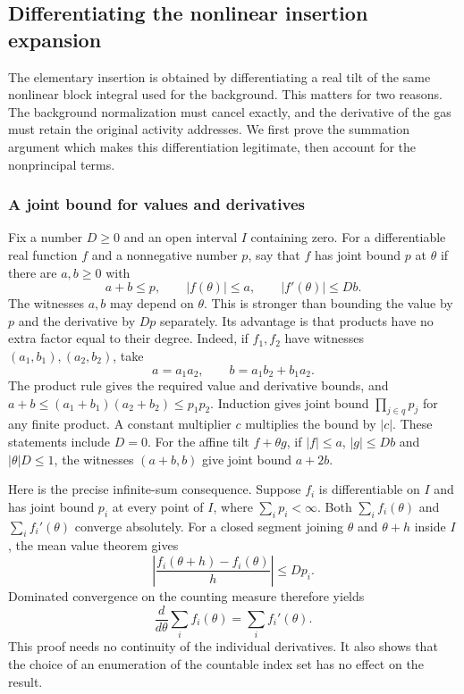 \subsection{Differentiating the nonlinear insertion expansion}
\label{sec:leaf-expansion}
The elementary insertion is obtained by differentiating a real tilt of the
same nonlinear block integral used for the background. This matters for two
reasons. The background normalization must cancel exactly, and the derivative
of the gas must retain the original activity addresses. We first prove the
summation argument which makes this differentiation legitimate, then account
for the nonprincipal terms.

\subsubsection{A joint bound for values and derivatives}
Fix a number $D\ge0$ and an open interval $I$ containing zero. For a
differentiable real function $f$ and a nonnegative number $p$, say that
$f$ has joint bound $p$ at $\theta$ if there are $a,b\ge0$ with
\begin{equation}\label{eq:leaf-joint-bound}
 a+b\le p,\qquad |f(\theta)|\le a,\qquad
                         |f'(\theta)|\le Db.
\end{equation}
The witnesses $a,b$ may depend on $\theta$. This is stronger than
bounding the value by $p$ and the derivative by $Dp$ separately. Its
advantage is that products have no extra factor equal to their degree.
Indeed, if $f_1,f_2$ have witnesses $(a_1,b_1),(a_2,b_2)$, take
\[
       a=a_1a_2,\qquad b=a_1b_2+b_1a_2.
\]
The product rule gives the required value and derivative bounds, and
$a+b\le(a_1+b_1)(a_2+b_2)\le p_1p_2$. Induction gives joint
bound $\prod_{j\in q}p_j$ for any finite product. A constant multiplier
$c$ multiplies the bound by $|c|$. These statements include $D=0$.
For the affine tilt $f+\theta g$, if $|f|\le a$, $|g|\le Db$ and
$|\theta|D\le1$, the witnesses $(a+b,b)$ give joint bound $a+2b$.

Here is the precise infinite-sum consequence. Suppose $f_i$ is
differentiable on $I$ and has joint bound $p_i$ at every point of $I$,
where $\sum_i p_i<\infty$. Both $\sum_i f_i(\theta)$ and
$\sum_i f_i'(\theta)$ converge absolutely. For a closed segment
joining $\theta$ and $\theta+h$ inside $I$, the mean value theorem gives
\[
 \left|\frac{f_i(\theta+h)-f_i(\theta)}h\right|\le Dp_i.
\]
Dominated convergence on the counting measure therefore yields
\begin{equation}\label{eq:leaf-differentiate-sum}
             \frac{d}{d\theta}\sum_i f_i(\theta)
                         =\sum_i f_i'(\theta).
\end{equation}
This proof needs no continuity of the individual derivatives. It also
shows that the choice of an enumeration of the countable index set has
no effect on the result.

